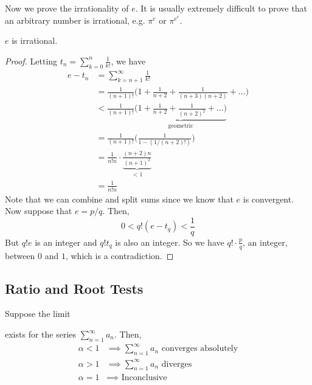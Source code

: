   Now we prove the irrationality of $e$. It is usually extremely difficult to prove that an arbitrary number is irrational, e.g. $\pi^e$ or $\pi^{e^e}$. 

  \begin{theorem}[$e$ is Irrational]
    $e$ is irrational. 
  \end{theorem}
  \begin{proof} 
    Letting $t_n = \sum_{k=0}^n \frac{1}{k!}$, we have 
    \begin{align}
      e - t_n & = \sum_{k=n+1}^\infty \frac{1}{k!} \\
              & = \frac{1}{(n+1)!} \bigg( 1 + \frac{1}{n+2} + \frac{1}{(n+3)(n+2)} + \ldots \bigg) \\
              & < \frac{1}{(n+1)!} \underbrace{\bigg( 1 + \frac{1}{n+2} + \frac{1}{(n+2)^2} + \ldots \bigg)}_{\text{geometric}} \\
              & = \frac{1}{(n+1)!} \bigg( \frac{1}{1 - (1/(n+2)!)}\bigg) \\
              & = \frac{1}{n! n} \cdot \underbrace{\frac{(n+2) n}{(n+1)^2}}_{< 1} \\
              & = \frac{1}{n! n}
    \end{align}
    Note that we can combine and split sums since we know that $e$ is convergent. Now suppose that $e = p/q$. Then, 
    \begin{equation}
      0 < q! (e - t_q) < \frac{1}{q}
    \end{equation}
    But $q! e$ is an integer and $q! t_q$ is also an integer. So we have $q! \cdot \frac{p}{q}$, an integer, between $0$ and $1$, which is a contradiction. 
  \end{proof}

\subsection{Ratio and Root Tests}

  \begin{theorem}
    Suppose the limit 
    exists for the series $\sum_{n=1}^\infty a_n$. Then, 
    \begin{align*}
        \alpha < 1 & \implies \sum_{n=1}^\infty a_n \text{ converges absolutely} \\
        \alpha > 1 & \implies \sum_{n=1}^\infty a_n \text{ diverges} \\
        \alpha = 1 & \implies \text{ Inconclusive}
    \end{align*}
  \end{theorem}

